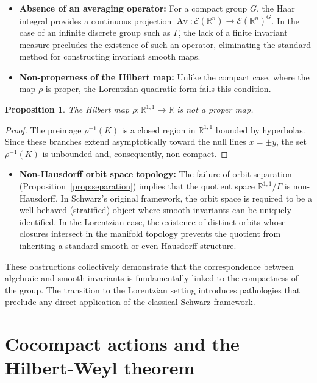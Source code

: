 \documentclass[]{article}
\newtheorem{proposition}[theorem]{Proposition}
\begin{document}
\begin{itemize}
	\item \textbf{Absence of an averaging operator:} For a compact group $G$, the Haar integral provides a continuous projection $\operatorname{Av}: \mathcal{E}(\mathbb{R}^n) \to \mathcal{E}(\mathbb{R}^n)^G$. In the case of an infinite discrete group such as $\Gamma$, the lack of a finite invariant measure precludes the existence of such an operator, eliminating the standard method for constructing invariant smooth maps.
	\item \textbf{Non-properness of the Hilbert map:} Unlike the compact case, where the map $\rho$ is proper, the Lorentzian quadratic form fails this condition. 
\end{itemize}

\begin{proposition} \label{prop:nonproper}
	The Hilbert map $\rho: \mathbb{R}^{1,1} \to \mathbb{R}$ is not a proper map.
\end{proposition}
\begin{proof}
	The preimage $\rho^{-1}(K)$ is a closed region in $\mathbb{R}^{1,1}$ bounded by hyperbolas. Since these branches extend asymptotically toward the null lines $x = \pm y$, the set $\rho^{-1}(K)$ is unbounded and, consequently, non-compact.
\end{proof}

\begin{itemize}
	\item \textbf{Non-Hausdorff orbit space topology:} The failure of orbit separation (Proposition~\ref{prop:separation}) implies that the quotient space $\mathbb{R}^{1,1}/\Gamma$ is non-Hausdorff. In Schwarz’s original framework, the orbit space is required to be a well-behaved (stratified) object where smooth invariants can be uniquely identified. In the Lorentzian case, the existence of distinct orbits whose closures intersect in the manifold topology prevents the quotient from inheriting a standard smooth or even Hausdorff structure.
\end{itemize}

These obstructions collectively demonstrate that the correspondence between algebraic and smooth invariants is fundamentally linked to the compactness of the group. The transition to the Lorentzian setting introduces pathologies that preclude any direct application of the classical Schwarz framework.

\section{Cocompact actions and the Hilbert-Weyl theorem}
\end{document}
